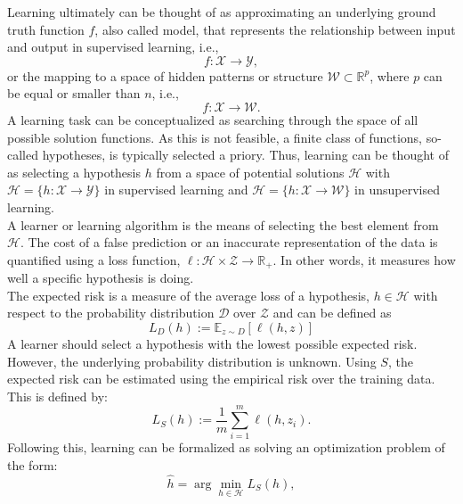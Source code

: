 \begin{tcolorbox}
    Learning ultimately can be thought of as approximating an underlying ground truth function $f$, also called model, that represents the relationship between input and output in supervised learning, i.e., 
    \begin{equation}
    f:\mathcal{X}\rightarrow\mathcal{Y},
    \end{equation}
    or the mapping to a space of hidden patterns or structure $\mathcal{W}\subset\mathbb{R}^p$, where $p$ can be equal or smaller than $n$, i.e.,
    \begin{equation}
    f:\mathcal{X}\rightarrow\mathcal{W}.
    \end{equation}
    A learning task can be conceptualized as searching through the space of all possible solution functions. As this is not feasible, a finite class of functions, so-called hypotheses, is typically selected a priory. Thus, learning can be thought of as selecting a hypothesis $h$ from a space of potential solutions $\mathcal{H}$ with $\mathcal{H}=\{h:\mathcal{X}\rightarrow\mathcal{Y}\}$ in supervised learning and $\mathcal{H}=\{h:\mathcal{X}\rightarrow\mathcal{W}\}$ in unsupervised learning. \\
    A learner or learning algorithm is the means of selecting the best element from $\mathcal{H}$.
    The cost of a false prediction or an inaccurate representation of the data is quantified using a loss function, $\ell:\mathcal{H}\times\mathcal{Z}\rightarrow\mathbb{R}_+$. In other words, it measures how well a specific hypothesis is doing.\\
    The expected risk is a measure of the average loss of a hypothesis, $h\in\mathcal{H}$ with respect to the probability distribution $\mathcal{D}$ over $\mathcal{Z}$ and can be defined as
    \begin{equation}
    L_{D}(h):=\mathbb{E}_{z\sim D}[\ell(h,z)]
    \end{equation}
    A learner should select a hypothesis with the lowest possible expected risk. However, the underlying probability distribution is unknown. Using $S$, the expected risk can be estimated using the empirical risk over the training data. This is defined by:
    \begin{equation}
    L_{S}(h):=\frac{1}{m}\sum_{i=1}^m\ell(h,z_i).
    \end{equation}
    Following this, learning can be formalized as solving an optimization problem of the form: 
    \begin{equation}
    \hat{h}=\arg\min_{h\in\mathcal{H}}L_{S}(h),
    \end{equation}

\end{tcolorbox}
